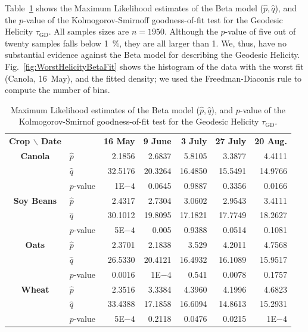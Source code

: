 \documentclass[journal]{IEEEtran}
\begin{document}
{Table~\ref{tab:params_helicity} shows the Maximum Likelihood estimates of the Beta model ($\widehat p,\widehat q$), and the $p$-value of the Kolmogorov-Smirnoff goodness-of-fit test for the Geodesic Helicity $\tau_{\text{GD}}$.
All samples sizes are $n=1950$.
Although the $p$-value of five out of twenty samples falls below \SI{1}{\percent}, they are all larger than \SI{1}{\pertenmille}.
We, thus, have no substantial evidence against the Beta model for describing the Geodesic Helicity.
Fig.~\ref{fig:WorstHelicityBetaFit} shows the histogram of the data with the worst fit (Canola, 16~May), and the fitted density; we used the Freedman-Diaconis rule to compute the number of bins.

\begin{table}[hbt]
	\centering
	\caption{Maximum Likelihood estimates of the Beta model ($\widehat p,\widehat q$), and $p$-value of the Kolmogorov-Smirnof goodness-of-fit test for the Geodesic Helicity $\tau_{\text{GD}}$.}
	\label{tab:params_helicity}
	\setlength{\tabcolsep}{3.8pt}
	\begin{tabular}{clrrrrr}
		\toprule
		\textbf{Crop $\backslash$ Date} & & \textbf{16 May} & \textbf{9 June} & \textbf{3 July} & \textbf{27 July} & \textbf{20 Aug.}\\ \cmidrule(lr){1-2} \cmidrule(lr){3-3} \cmidrule(lr){4-4} \cmidrule(lr){5-5} \cmidrule(lr){6-6} \cmidrule(lr){7-7}
		\textbf{Canola}     
		& $\widehat{p}$ & 2.1856      & 2.6837    & 5.8105     & 3.3877      & 4.4111 \\
		& $\widehat{q}$ & 32.5176     & 20.3264     & 16.4850     & 15.5491     & 14.9766\\ 
		& $p$-value     & 1E$-4$         & 0.0645     & 0.9887     & 0.3356     & 0.0166\\        
		\midrule
		\textbf{Soy Beans}
		& $\widehat{p}$ & 2.4317       & 2.7304       & 3.0602       & 2.9543       & 3.4111 \\
		& $\widehat{q}$ & 30.1012   & 19.8095   & 17.1821   & 17.7749   & 18.2627 \\ 
		& $p$-value     & 5E$-4$     & 0.005     & 0.9388     & 0.0514     & 0.1081\\            
		\midrule
		\textbf{Oats}
		& $\widehat{p}$ & 2.3701       & 2.1838      & 3.529     & 4.2011     & 4.7568 \\
		& $\widehat{q}$ & 26.5330     & 20.4121   & 16.4932     & 16.1089      & 15.9517 \\ 
		& $p$-value     & 0.0016     & 1E$-4$     & 0.541     & 0.0078    & 0.1757 \\
		\midrule
		\textbf{Wheat} 
		& $\widehat{p}$ & 2.3516       & 3.3384      & 4.3960      & 4.1996      & 4.6823   \\
		& $\widehat{q}$ & 33.4388   & 17.1858   & 16.6094   & 14.8613   & 15.2931   \\
		& $p$-value     & 5E$-4$     & 0.2118     & 0.0476     & 0.0215     & 1E$-4$\\    
		\bottomrule
	\end{tabular}
\end{table}

}
\end{document}
